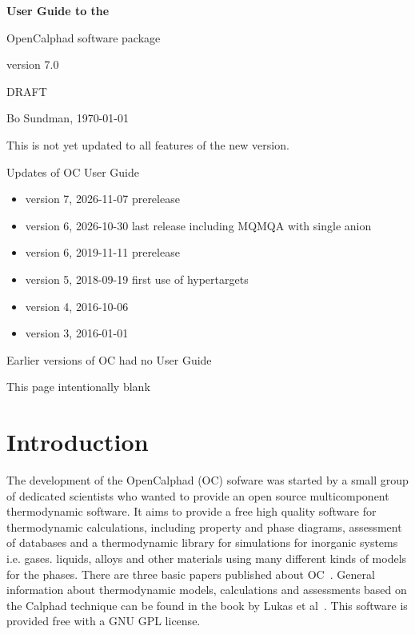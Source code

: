 \documentclass[11pt]{article}
\begin{document}
\begin{center}

{\Huge \bf User Guide to the 

OpenCalphad software package

version 7.0

}

\bigskip

{\Large DRAFT}

\bigskip

Bo Sundman, \today

\end{center}

\vspace{25mm}

This is not yet updated to all features of the new version.

\bigskip

Updates of OC User Guide
\begin{itemize}
\item version 7, 2026-11-07 prerelease
\item version 6, 2026-10-30 last release including MQMQA with single anion
\item version 6, 2019-11-11 prerelease
\item version 5, 2018-09-19 first use of hypertargets
\item version 4, 2016-10-06
\item version 3, 2016-01-01
\end{itemize}

Earlier versions of OC had no User Guide

\newpage

This page intentionally blank

\newpage

\tableofcontents

\newpage

\section{Introduction}

The development of the OpenCalphad (OC) sofware was started by a small
group of dedicated scientists who wanted to provide an open source
multicomponent thermodynamic software.  It aims to provide a free high
quality software for thermodynamic calculations, including property
and phase diagrams, assessment of databases and a thermodynamic
library for simulations for inorganic systems i.e.  gases. liquids,
alloys and other materials using many different kinds of models for
the phases.  There are three basic papers published about
OC~\cite{15Sun1,15Sun2,16Sun}.  General information about
thermodynamic models, calculations and assessments based on the
Calphad technique can be found in the book by Lukas et
al~\cite{07Luk}.  This software is provided free with a GNU GPL
license.
\end{document}
